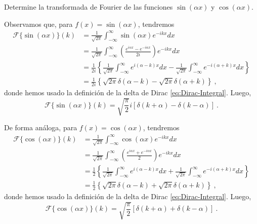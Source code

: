 \begin{ejemplo}
    Determine la transformada de Fourier de las funciones $\sin(\alpha x)$ y $\cos(\alpha x)$.

    Observamos que, para $f(x) = \sin(\alpha x)$, tendremos
    \begin{align*}
        \mathcal{F}\{\sin(\alpha x)\}(k) & = \frac{1}{\sqrt{2\pi}} \int_{-\infty}^\infty \sin(\alpha x) e^{-ikx} dx \\
        & = \frac{1}{\sqrt{2\pi}} \int_{-\infty}^\infty \left( \frac{e^{i\alpha x} - e^{-i\alpha x}}{2i} \right) e^{-ikx} dx \\
        & = \frac{1}{2i} \left\{ \frac{1}{\sqrt{2\pi}} \int_{-\infty}^\infty e^{i(\alpha - k)x} dx - \frac{1}{\sqrt{2\pi}} \int_{-\infty}^\infty e^{-i(\alpha+k)x} dx \right\} \\
        & = \frac{1}{2i} \left\{ \sqrt{2\pi} \delta(\alpha-k) - \sqrt{2\pi} \delta(\alpha+k) \right\} \ , 
    \end{align*}
    donde hemos usado la definición de la delta de Dirac \eqref{eq:Dirac-Integral}. Luego,
    \begin{equation}
        \boxed{\mathcal{F}\{\sin(\alpha x)\}(k) = \sqrt{\frac{\pi}{2}}i[\delta(k+\alpha) - \delta(k-\alpha)] \ .}
    \end{equation}

    De forma análoga, para $f(x) = \cos(\alpha x)$, tendremos
    \begin{align*}
        \mathcal{F}\{\cos(\alpha x)\}(k) & = \frac{1}{\sqrt{2\pi}} \int_{-\infty}^\infty \cos(\alpha x) e^{-ikx} dx \\
        & = \frac{1}{\sqrt{2\pi}} \int_{-\infty}^\infty \left( \frac{e^{i\alpha x} + e^{-i\alpha x}}{2} \right) e^{-ikx} dx \\
        & = \frac{1}{2} \left\{ \frac{1}{\sqrt{2\pi}} \int_{-\infty}^\infty e^{i(\alpha - k)x} dx + \frac{1}{\sqrt{2\pi}} \int_{-\infty}^\infty e^{-i(\alpha+k)x} dx \right\} \\
        & = \frac{1}{2} \left\{ \sqrt{2\pi} \delta(\alpha-k) + \sqrt{2\pi} \delta(\alpha+k) \right\} \ , 
    \end{align*}
    donde hemos usado la definición de la delta de Dirac \eqref{eq:Dirac-Integral}. Luego,
    \begin{equation}
        \boxed{\mathcal{F}\{\cos(\alpha x)\}(k) = \sqrt{\frac{\pi}{2}}[\delta(k+\alpha) + \delta(k-\alpha)] \ .}
    \end{equation}

\end{ejemplo}

